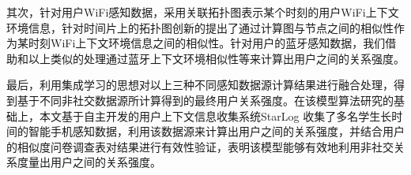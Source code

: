 \begin{cabstract}
\par 其次，针对用户WiFi感知数据，采用关联拓扑图表示某个时刻的用户WiFi上下文环境信息，针对时间片上的拓扑图创新的提出了通过计算图与节点之间的相似性作为某时刻WiFi上下文环境信息之间的相似性。针对用户的蓝牙感知数据，我们借助和以上类似的处理通过蓝牙上下文环境相似性等来计算出用户之间的关系强度。

\par 最后，利用集成学习的思想对以上三种不同感知数据源计算结果进行融合处理，得到基于不同非社交数据源所计算得到的最终用户关系强度。在该模型算法研究的基础上，本文基于自主开发的用户上下文信息收集系统StarLog 收集了多名学生长时间的智能手机感知数据，利用该数据源来计算出用户之间的关系强度，并结合用户的相似度问卷调查表对结果进行有效性验证，表明该模型能够有效地利用非社交关系度量出用户之间的关系强度。
\end{cabstract}
